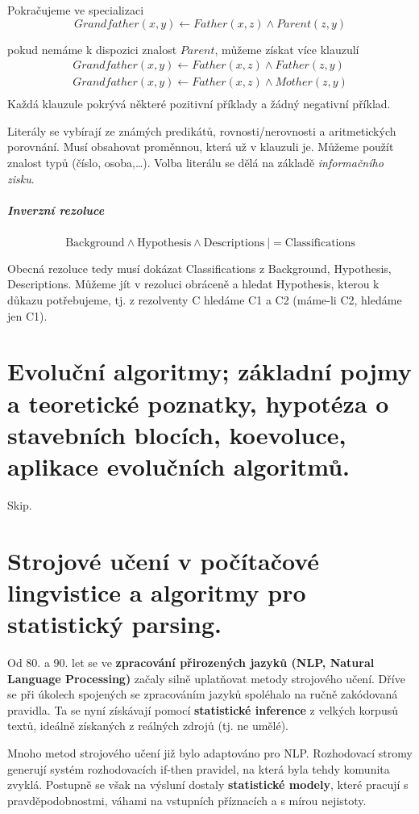 \documentclass[11pt]{report} %
\numberwithin{equation}{section}
\begin{document}
Pokračujeme ve specializaci
$$Grandfather(x,y) \gets Father(x,z) \wedge Parent(z,y)$$

pokud nemáme k dispozici znalost $Parent$, můžeme získat více klauzulí
\begin{align*}
Grandfather(x,y) \gets Father(x,z) \wedge Father(z,y) \\
Grandfather(x,y) \gets Father(x,z) \wedge Mother(z,y) \\
\end{align*}
Každá klauzule pokrývá některé pozitivní příklady a žádný negativní příklad.

Literály se vybírají ze známých predikátů, rovnosti/nerovnosti a aritmetických porovnání. Musí obsahovat proměnnou, která už v klauzuli je. Můžeme použít znalost typů (číslo, osoba,\dots). Volba literálu se dělá na základě \textit{informačního zisku}.

\subparagraph{Inverzní rezoluce}
$$\text{Background} \wedge \text{Hypothesis} \wedge \text{Descriptions}\ {|}= \text{Classifications}$$

Obecná rezoluce tedy musí dokázat Classifications z Background, Hypothesis, Descriptions. Můžeme jít v rezoluci obráceně a hledat Hypothesis, kterou k důkazu potřebujeme, tj. z rezolventy C hledáme C1 a C2 (máme-li C2, hledáme jen C1).


\section{Evoluční algoritmy; základní pojmy a teoretické poznatky, hypotéza o stavebních blocích, koevoluce, aplikace evolučních algoritmů.}
Skip.

\section{Strojové učení v počítačové lingvistice a algoritmy pro statistický parsing.}
Od 80. a 90. let se ve \textbf{zpracování přirozených jazyků (NLP, Natural Language Processing)} začaly silně uplatňovat metody strojového učení. Dříve se při úkolech spojených se zpracováním jazyků spoléhalo na ručně zakódovaná pravidla. Ta se nyní získávají pomocí \textbf{statistické inference} z velkých korpusů textů, ideálně získaných z reálných zdrojů (tj. ne umělé). 

Mnoho metod strojového učení již bylo adaptováno pro NLP. Rozhodovací stromy generují systém rozhodovacích if-then pravidel, na která byla tehdy komunita zvyklá. Postupně se však na výsluní dostaly \textbf{statistické modely}, které pracují s pravděpodobnostmi, váhami na vstupních příznacích a s mírou nejistoty.
\end{document}
